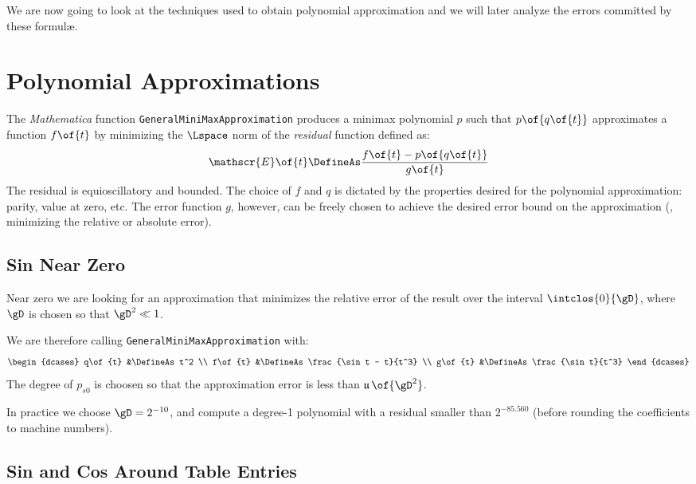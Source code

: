 \documentclass[10pt, a4paper, twoside]{basestyle}
\DeclareMathOperator{\ULP}{\mathfrak u}
\begin{document}
We are now going to look at the techniques used to obtain polynomial approximation and we will later analyze the errors committed by these formulæ.

\section*{Polynomial Approximations}

The \textit{Mathematica} function \texttt{GeneralMiniMaxApproximation} produces a minimax polynomial $p$ such that $p\of{q\of{t}}$ approximates a function $f\of{t}$ by minimizing the $\Lspace$ norm of the \emph{residual} function defined as:
\[
\mathscr{E}\of{t} \DefineAs \frac{f\of{t} - p\of{q\of{t}}}{g\of{t}}
\]
The residual is equioscillatory and bounded.  The choice of $f$ and $q$ is dictated by the properties desired for the polynomial approximation: parity, value at zero, etc.  The error function $g$, however, can be freely chosen to achieve the desired error bound on the approximation (\exempligratia, minimizing the relative or absolute error).

\subsection*{Sin Near Zero}

Near zero we are looking for an approximation that minimizes the relative error of the result over the interval $\intclos{0}{\gD}$, where $\gD$ is chosen so that $\gD^2 \ll 1$.

We are therefore calling \texttt{GeneralMiniMaxApproximation} with:
\[
\begin{dcases}
q\of{t} &\DefineAs t^2 \\
f\of{t} &\DefineAs \frac{\sin t - t}{t^3} \\
g\of{t} &\DefineAs \frac{\sin t}{t^3}
\end{dcases}
\]
The degree of $p_{s0}$ is choosen so that the approximation error is less than $\ULP\of{\gD^2}$.

In practice we choose $\gD = 2^{-10}$, and compute a degree-1 polynomial with a residual smaller than $2^{-85.560}$ (before rounding the coefficients to machine numbers).

\subsection*{Sin and Cos Around Table Entries}
\end{document}
